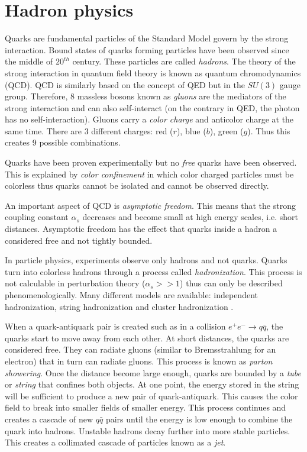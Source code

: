 \section{Hadron physics}

Quarks are fundamental particles of the Standard Model govern by the strong interaction. Bound states of quarks forming particles have been observed since the middle of $20^{th}$ century. These particles are called \textit{hadrons}. The theory of the strong interaction in quantum field theory is known as quantum chromodynamics (QCD). QCD is similarly based on the concept of QED but in the $SU(3)$ gauge group. Therefore, 8 massless bosons known as \textit{gluons} are the mediators of the strong interaction and can also self-interact (on the contrary in QED, the photon has no self-interaction). Gluons carry a \textit{color charge} and anticolor charge at the same time. There are 3 different charges: red ($r$), blue ($b$), green ($g$). Thus this creates 9 possible combinations.

Quarks have been proven experimentally but no \textit{free} quarks have been observed. This is explained by \textit{color confinement} in which color charged particles must be colorless thus quarks cannot be isolated and cannot be observed directly.

An important aspect of QCD is \textit{asymptotic freedom}. This means that the strong coupling constant $\alpha_s$ decreases and become small at high energy scales, i.e. short distances. Asymptotic freedom has the effect that quarks inside a hadron a considered free and not tightly bounded.

In particle physics, experiments observe only hadrons and not quarks. Quarks turn into colorless hadrons through a process called \textit{hadronization}. This process is not calculable in perturbation theory ($\alpha_s >> 1$) thus can only be described phenomenologically. Many different models are available: independent hadronization, string hadronization \cite{Artru1988} and cluster hadronization \cite{Webber:1983if}.

When a quark-antiquark pair is created such as in a collision $e^+e^- \rightarrow q\bar{q}$, the quarks start to move away from each other. At short distances, the quarks are considered free. They can radiate gluons (similar to Bremsstrahlung for an electron) that in turn can radiate gluons. This process is known as \textit{parton showering}. Once the distance become large enough, quarks are bounded by a \textit{tube} or \textit{string} that confines both objects. At one point, the energy stored in the string will be sufficient to produce a new pair of quark-antiquark. This causes the color field to break into smaller fields of smaller energy. This process continues and creates a cascade of new $q\bar{q}$ pairs until the energy is low enough to combine the quark into hadrons. Unstable hadrons decay further into more stable particles. This creates a collimated cascade of particles known as a \textit{jet}.

